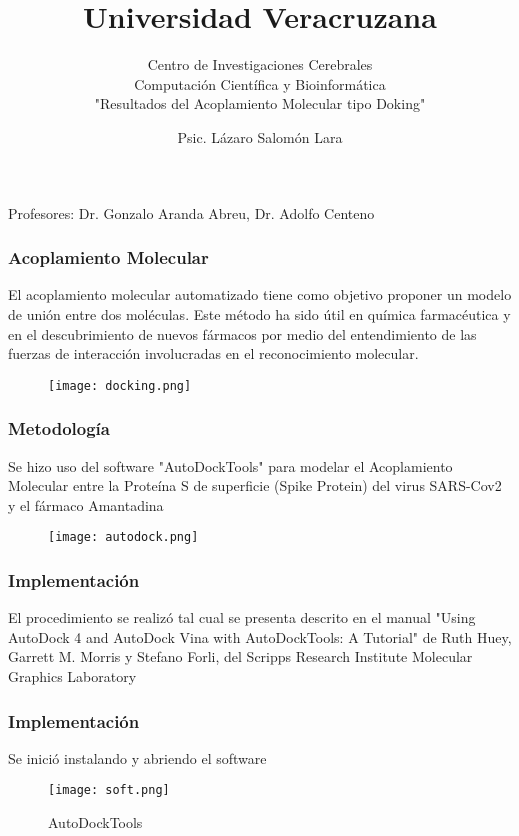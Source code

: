 \documentclass{beamer}
\begin{document}
\title{Universidad Veracruzana}  
\subtitle{Centro de Investigaciones Cerebrales\\Computación Científica y Bioinformática\\
"Resultados del Acoplamiento Molecular tipo Doking"}
\author{Psic. Lázaro Salomón Lara}
\date{} 
\begin{frame}
\titlepage
Profesores: Dr. Gonzalo Aranda Abreu, Dr. Adolfo Centeno
\end{frame}


\begin{frame}\frametitle{Acoplamiento Molecular}
El acoplamiento molecular automatizado tiene como objetivo proponer un modelo de unión entre dos moléculas. Este método ha sido útil en química farmacéutica y en el descubrimiento de nuevos fármacos por medio del entendimiento de las fuerzas de interacción involucradas en el reconocimiento molecular.
 \begin{figure}[h]
      \centering
      \texttt{[image: docking.png]}

      \label{fig:my_label}
  \end{figure}  
\end{frame} 


\begin{frame}\frametitle{Metodología}
Se hizo uso del software "AutoDockTools" para modelar el Acoplamiento Molecular entre la Proteína S de superficie (Spike Protein) del virus SARS-Cov2 y el fármaco Amantadina
 \begin{figure}[h]
      \centering
      \texttt{[image: autodock.png]}

      \label{fig:my_label}
  \end{figure}  
\end{frame} 


\begin{frame}\frametitle{Implementación}
El procedimiento se realizó tal cual se presenta descrito en el manual "Using AutoDock 4 and
AutoDock Vina with AutoDockTools: A Tutorial" de Ruth Huey, Garrett M. Morris y Stefano Forli, del Scripps Research Institute
Molecular Graphics Laboratory
\end{frame} 


\begin{frame}\frametitle{Implementación}
Se inició instalando y abriendo el software
  \begin{figure}[h]
      \centering
      \texttt{[image: soft.png]}
      \caption{AutoDockTools}
      \label{fig:my_label}
  \end{figure}  
\end{frame} 
\end{document}
